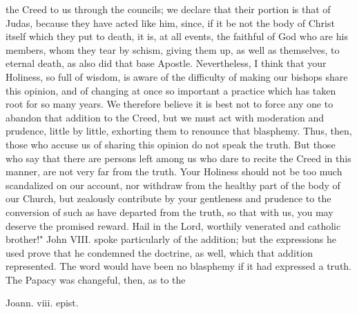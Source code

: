 the Creed to us through the councils; we declare that their portion is that of Judas, because they have acted like him, since, if it be not the body of Christ itself which they put to death, it is, at all events, the faithful of God who are his members, whom they tear by schism, giving them up, as well as themselves, to eternal death, as also did that base Apostle. Nevertheless, I think that your Holiness, so full of wisdom, is aware of the difficulty of making our bishops share this opinion, and of changing at once so important a practice which has taken root for so many years. We therefore believe it is best not to force any one to abandon that addition to the Creed, but we must act with moderation and prudence, little by little, exhorting them to renounce that blasphemy. Thus, then, those who accuse us of sharing this opinion do not speak the truth. But those who say that there are persons left among us who dare to recite the Creed in this manner, are not very far from the truth. Your Holiness should not be too much scandalized on our account, nor withdraw from the healthy part of the body of our Church, but zealously contribute by your gentleness and prudence to the conversion of such as have departed from the truth, so that with us, you may deserve the promised reward. Hail in the Lord, worthily venerated and catholic brother!" John VIII. spoke particularly of the addition; but the expressions he used prove that he condemned the doctrine, as well, which that addition represented. The word would have been no blasphemy if it had expressed a truth. The Papacy was changeful, then, as to the

Joann. viii. epist.

